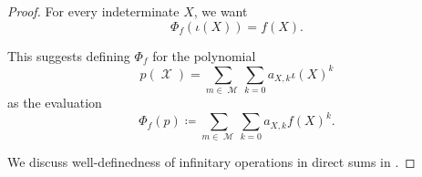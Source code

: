 \begin{proof}
  For every indeterminate \( X \), we want
  \begin{equation*}
    \Phi_f(\iota(X)) = f(X).
  \end{equation*}

  This suggests defining \( \Phi_f \) for the polynomial
  \begin{equation*}
    p(\mscrX) = \sum_{m \in \mscrM} \sum_{k=0} a_{X,k} \iota(X)^k
  \end{equation*}
  as the evaluation
  \begin{equation*}
    \Phi_f(p) \coloneqq \sum_{m \in \mscrM} \sum_{k=0} a_{X,k} f(X)^k.
  \end{equation*}

  We discuss well-definedness of infinitary operations in direct sums in .
\end{proof}
